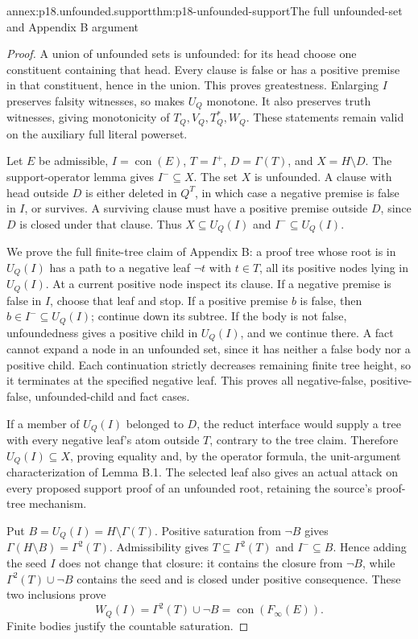 \begin{annexitem}{annex:p18.unfounded.support}{thm:p18-unfounded-support}{The full unfounded-set and Appendix B argument}
\begin{proof}
A union of unfounded sets is unfounded: for its head
choose one constituent containing that head. Every
clause is false or has a positive premise in that
constituent, hence in the union. This proves greatestness.
Enlarging \(I\) preserves falsity witnesses, so makes
\(U_Q\) monotone. It also preserves truth witnesses,
giving monotonicity of \(T_Q,V_Q,T_Q^*,W_Q\).
These statements remain valid on the auxiliary full
literal powerset.

Let \(E\) be admissible, \(I=\operatorname{con}(E)\),
\(T=I^+\), \(D=\Gamma(T)\), and \(X=H\setminus D\).
The support-operator lemma gives \(I^-\subseteq X\).
The set \(X\) is unfounded. A clause with head
outside \(D\) is either deleted in \(Q^T\), in
which case a negative premise is false in \(I\),
or survives. A surviving clause must have a
positive premise outside \(D\), since \(D\) is
closed under that clause. Thus \(X\subseteq U_Q(I)\)
and \(I^-\subseteq U_Q(I)\).

We prove the full finite-tree claim of Appendix B:
a proof tree whose root is in \(U_Q(I)\) has a
path to a negative leaf \(\neg t\) with \(t\in T\),
all its positive nodes lying in \(U_Q(I)\).
At a current positive node inspect its clause.
If a negative premise is false in \(I\), choose
that leaf and stop. If a positive premise \(b\)
is false, then \(b\in I^-\subseteq U_Q(I)\);
continue down its subtree. If the body is not
false, unfoundedness gives a positive child in
\(U_Q(I)\), and we continue there. A fact cannot
expand a node in an unfounded set, since it
has neither a false body nor a positive child.
Each continuation strictly decreases remaining
finite tree height, so it terminates at the
specified negative leaf. This proves all
negative-false, positive-false, unfounded-child
and fact cases.

If a member of \(U_Q(I)\) belonged to \(D\),
the reduct interface would supply a tree with
every negative leaf's atom outside \(T\), contrary
to the tree claim. Therefore \(U_Q(I)\subseteq X\),
proving equality and, by the operator formula,
the unit-argument characterization of Lemma B.1.
The selected leaf also gives an actual attack
on every proposed support proof of an unfounded
root, retaining the source's proof-tree mechanism.

Put \(B=U_Q(I)=H\setminus\Gamma(T)\).
Positive saturation from \(\neg B\) gives
\(\Gamma(H\setminus B)=\Gamma^2(T)\).
Admissibility gives \(T\subseteq\Gamma^2(T)\)
and \(I^-\subseteq B\). Hence adding the seed
\(I\) does not change that closure: it contains
the closure from \(\neg B\), while
\(\Gamma^2(T)\cup\neg B\) contains the seed
and is closed under positive consequence.
These two inclusions prove
\[
 W_Q(I)=\Gamma^2(T)\cup\neg B
                    =\operatorname{con}(F_\infty(E)).
\]
Finite bodies justify the countable saturation.
\end{proof}
\end{annexitem}

